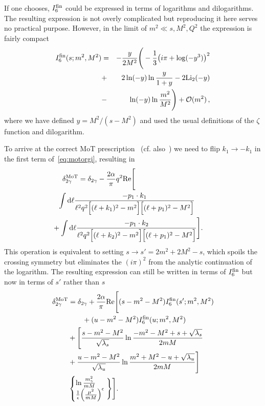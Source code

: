 If one chooses, $I_6^{\rm fin}$ could be expressed in terms of logarithms and dilogarithms.
The resulting expression is not overly complicated but reproducing it here serves no practical purpose.
However, in the limit of $m^2\ll s,M^2,Q^2$ the expression is fairly compact
\begin{eqnarray}
    I_6^{\rm fin}(s;m^2,M^2) &=& -\frac{y}{2M^2}\Bigg(
        -\frac13\big(i\pi+\log(-y^3)\big)^2\nonumber\\ &+ &2\ln(-y) \ln\frac y{1+y} - 2{\rm Li}_2(-y) \nonumber\\&-& \ln(-y)\ln\frac{m^2}{M^2}
    \Bigg) + \mathcal{O}(m^2)\,,
\end{eqnarray}
where we have defined $y=M^2/(s-M^2)$ and used the usual definitions of the $\zeta$ function and dilogarithm.

To arrive at the correct MoT prescription~\cite{Mo:1968cg} (cf. also~\cite{Arrington:2011dn}) we need to flip $k_1\to-k_1$ in the first term of~\eqref{eq:motorgi}, resulting in
\begin{align}
    &\delta_{2\gamma}^{\rm MoT} = \delta_{2\gamma} -
        \frac{2\alpha}{\pi} q^2 \Re\Bigg[\nn\\
      &  \hspace{-0.5cm}\phantom{+}\int \dd \ell \frac{-p_1\cdot k_1 }{
            \ell^2
            q^2
            \Big[(\ell+k_1)^2-m^2\Big]
            \Big[(\ell+p_1)^2-M^2\Big]
        } \nn\\
      &  \hspace{-0.5cm}+\int \dd \ell \frac{-p_1\cdot k_2 }{
            \ell^2
            q^2
            \Big[(\ell+k_2)^2-m^2\Big]
            \Big[(\ell+p_1)^2-M^2\Big]
        } \Bigg].
\end{align}
This operation is equivalent to setting $s\to s'=2 m^2 + 2 M^2 - s$, which spoils the crossing symmetry but eliminates the $(i\pi)^2$ from the analytic continuation of the logarithm.
The resulting expression can still be written in terms of $I_6^{\rm fin}$ but now in terms of $s'$ rather than $s$
\begin{align}
    \delta_{2\gamma}^{\rm MoT} &= \delta_{2\gamma} +
        \frac{2 \alpha}{\pi} \mathrm{Re}\Bigg [
              (s - m^2 - M^2) I_6^{\rm fin}(s';m^2,M^2) \nonumber\\
            &\qquad+ (u - m^2 - M^2) I_6^{\rm fin}(u;m^2,M^2)\nonumber\\
            &+\Bigg[
                  \frac{s-m^2-M^2}{\sqrt{\lambda_{s}}}\ln\frac{-m^2-M^2+s + \sqrt{\lambda_{s}}}{2mM}\nonumber\\
               &+\frac{u-m^2-M^2}{\sqrt{\lambda_{u}}}\ln\frac{ m^2+M^2-u + \sqrt{\lambda_{u}}}{2mM}
            \Bigg]\nonumber\\
            &\begin{cases} \ln\frac{m_\gamma^2}{mM} \\ \frac1{\epsilon}\Big(\frac{\mu^2}{mM}\Big)^\epsilon \end{cases}\!\!\!\!\!\!\Bigg\} \Bigg].
\end{align}
